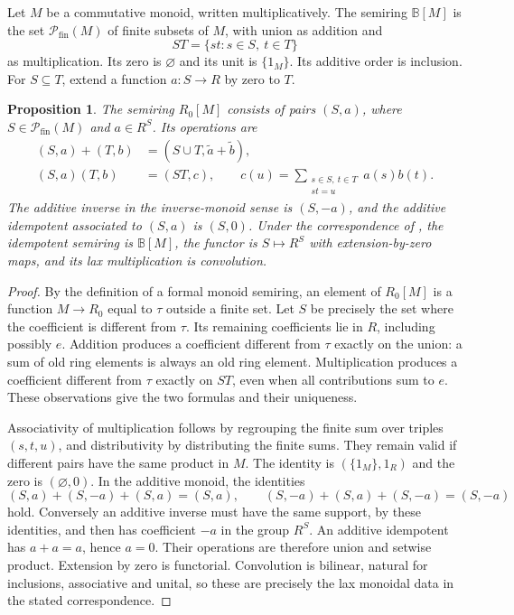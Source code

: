 \documentclass[11pt]{article}
\newcommand{\B}{\mathbb B}
\newcommand{\Fin}{\mathcal P_{\mathrm{fin}}}
\newtheorem{proposition}[theorem]{Proposition}
\theoremstyle{definition}
\theoremstyle{remark}
\begin{document}
Let $M$ be a commutative monoid, written multiplicatively. The semiring $\B[M]$ is the set $\Fin(M)$ of finite subsets of $M$, with union as addition and
\[
 ST=\{st:s\in S,\ t\in T\}
\]
as multiplication. Its zero is $\varnothing$ and its unit is $\{1_M\}$. Its additive order is inclusion. For $S\subseteq T$, extend a function $a:S\to R$ by zero to $T$.

\begin{proposition}\label{prop:monoid}
The semiring $R_0[M]$ consists of pairs $(S,a)$, where $S\in\Fin(M)$ and $a\in R^S$. Its operations are
\begin{align*}
 (S,a)+(T,b)&=(S\cup T,\widetilde a+\widetilde b),\\
 (S,a)(T,b)&=(ST,c),\qquad
 c(u)=\sum_{\substack{s\in S,\ t\in T\\st=u}}a(s)b(t).
\end{align*}
The additive inverse in the inverse-monoid sense is $(S,-a)$, and the additive idempotent associated to $(S,a)$ is $(S,0)$. Under the correspondence of \citet[Theorem~8.5]{CFMM}, the idempotent semiring is $\B[M]$, the functor is $S\mapsto R^S$ with extension-by-zero maps, and its lax multiplication is convolution.
\end{proposition}
\begin{proof}
By the definition of a formal monoid semiring, an element of $R_0[M]$ is a function $M\to R_0$ equal to $\tau$ outside a finite set. Let $S$ be precisely the set where the coefficient is different from $\tau$. Its remaining coefficients lie in $R$, including possibly $e$. Addition produces a coefficient different from $\tau$ exactly on the union: a sum of old ring elements is always an old ring element. Multiplication produces a coefficient different from $\tau$ exactly on $ST$, even when all contributions sum to $e$. These observations give the two formulas and their uniqueness.

Associativity of multiplication follows by regrouping the finite sum over triples $(s,t,u)$, and distributivity by distributing the finite sums. They remain valid if different pairs have the same product in $M$. The identity is $(\{1_M\},1_R)$ and the zero is $(\varnothing,0)$. In the additive monoid, the identities
\[
 (S,a)+(S,-a)+(S,a)=(S,a),\qquad
 (S,-a)+(S,a)+(S,-a)=(S,-a)
\]
hold. Conversely an additive inverse must have the same support, by these identities, and then has coefficient $-a$ in the group $R^S$. An additive idempotent has $a+a=a$, hence $a=0$. Their operations are therefore union and setwise product. Extension by zero is functorial. Convolution is bilinear, natural for inclusions, associative and unital, so these are precisely the lax monoidal data in the stated correspondence.
\end{proof}
\end{document}
